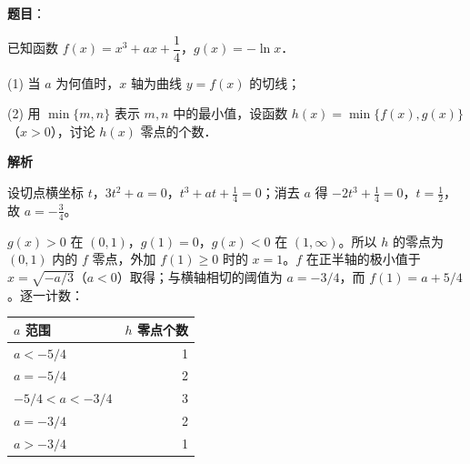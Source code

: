 \begin{answer}

\textbf{题目}：

已知函数 $f(x)=x^3+ax+\dfrac14$，$g(x)=-\ln x$．

(1) 当 $a$ 为何值时，$x$ 轴为曲线 $y=f(x)$ 的切线；

(2) 用 $\min\{m,n\}$ 表示 $m,n$ 中的最小值，设函数 $h(x)=\min\{f(x),g(x)\}$（$x>0$），讨论 $h(x)$ 零点的个数．

\textbf{解析}


设切点横坐标 $t$，$3t^2+a=0$，$t^3+at+\tfrac14=0$；消去 $a$ 得 $-2t^3+\tfrac14=0$，$t=\tfrac12$，故 $a=-\tfrac34$。


$g(x)>0$ 在 $(0,1)$，$g(1)=0$，$g(x)<0$ 在 $(1,\infty)$。所以 $h$ 的零点为 $(0,1)$ 内的 $f$ 零点，外加 $f(1)\geqslant0$ 时的 $x=1$。$f$ 在正半轴的极小值于 $x=\sqrt{-a/3}$（$a<0$）取得；与横轴相切的阈值为 $a=-3/4$，而 $f(1)=a+5/4$。逐一计数：

\begin{center}
\begin{tabular}{lr}
\toprule
$a$ 范围 & $h$ 零点个数 \\
\midrule
$a<-5/4$ & 1 \\
$a=-5/4$ & 2 \\
$-5/4<a<-3/4$ & 3 \\
$a=-3/4$ & 2 \\
$a>-3/4$ & 1 \\
\bottomrule
\end{tabular}
\end{center}



\end{answer}
